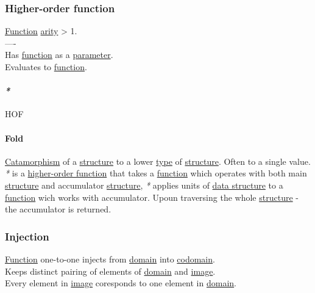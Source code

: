 \documentclass[11pt]{article}
\begin{document}
\subsubsection{\label{org4d1d0e3}Higher-order function}
\label{sec:orge80219b}
\hyperref[orge15bc14]{Function} \hyperref[orgde25f82]{arity} > 1.\\

----\\

Has \hyperref[orge15bc14]{function} as a \hyperref[org0e7674e]{parameter}.\\
Evaluates to \hyperref[orge15bc14]{function}.\\

\paragraph{\emph{*}}
\label{sec:org6c59947}

\label{org8573e58}HOF\\

\paragraph{\label{org2e54a0f}Fold}
\label{sec:orga13e148}
\hyperref[orgefe2953]{Catamorphism} of a \hyperref[org8051f61]{structure} to a lower \hyperref[orgc4aea2f]{type} of \hyperref[org8051f61]{structure}. Often to a single value.\\

\emph{*} is a \hyperref[org4d1d0e3]{higher-order function} that takes a \hyperref[orge15bc14]{function} which operates with both main \hyperref[org8051f61]{structure} and accumulator \hyperref[org8051f61]{structure}, \emph{*} applies units of \hyperref[org51ce163]{data structure} to a \hyperref[orge15bc14]{function} wich works with accumulator. Upoun traversing the whole \hyperref[org8051f61]{structure} - the accumulator is returned.\\

\subsubsection{\label{org50a8f52}Injection}
\label{sec:org5c74b54}
\hyperref[orge15bc14]{Function} one-to-one injects from \hyperref[org494b48a]{domain} into \hyperref[org410079d]{codomain}.\\

Keeps distinct pairing of elements of \hyperref[org494b48a]{domain} and \hyperref[orgef20814]{image}.\\
Every element in \hyperref[orgef20814]{image} coresponds to one element in \hyperref[org494b48a]{domain}.\\
\end{document}
